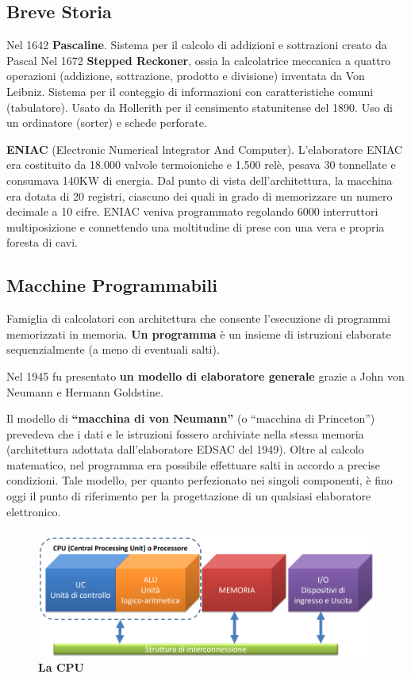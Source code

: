 \documentclass[12pt]{article} %
\begin{document}
\subsection{Breve Storia}
Nel 1642 \textbf{Pascaline}. Sistema per il calcolo di addizioni e sottrazioni creato da Pascal
Nel 1672 \textbf{Stepped Reckoner}, ossia la calcolatrice meccanica a quattro operazioni (addizione, sottrazione, prodotto e divisione) inventata da Von Leibniz. Sistema per il conteggio di informazioni con caratteristiche comuni (tabulatore). Usato da Hollerith per il censimento statunitense del 1890. Uso di un ordinatore (sorter) e schede perforate.\par\medskip\noindent
\textbf{ENIAC} (Electronic Numerical lntegrator And Computer). L’elaboratore ENIAC era costituito da
18.000 valvole termoioniche e 1.500 relè, pesava 30 tonnellate e consumava 140KW di energia. Dal punto di vista dell'architettura, la macchina era dotata di 20 registri, ciascuno dei quali in grado di memorizzare un numero decimale a 10 cifre. ENIAC veniva programmato regolando 6000 interruttori multiposizione e connettendo una moltitudine di prese con una vera e propria foresta di cavi.

\subsection{Macchine Programmabili}
Famiglia di calcolatori con architettura che consente l’esecuzione di programmi memorizzati in memoria. \textbf{Un programma }è un insieme di istruzioni elaborate sequenzialmente (a meno di eventuali salti). \par\medskip\noindent
Nel 1945 fu presentato \textbf{un modello di elaboratore generale} grazie a John von Neumann e Hermann Goldstine. \par\medskip\noindent
Il modello di \textbf{“macchina di von Neumann”} (o “macchina di Princeton”) prevedeva che i dati e le istruzioni fossero archiviate nella stessa memoria (architettura adottata dall’elaboratore EDSAC del 1949). Oltre al calcolo matematico, nel programma era possibile effettuare salti in accordo a precise condizioni. Tale modello, per quanto perfezionato nei singoli componenti, è fino oggi il punto di riferimento per la progettazione di un qualsiasi elaboratore elettronico.
\begin{figure}[h]
    \centering
    \includegraphics[width=0.75\linewidth]{von neumann.png}
    \caption{\textbf{La CPU}}
\end{figure}
\newpage
\end{document}
